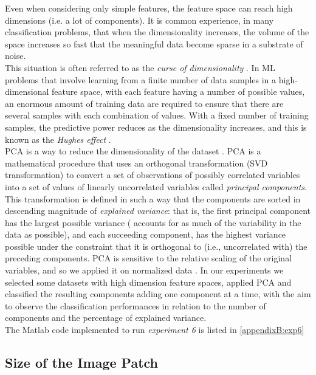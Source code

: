 Even when considering only simple features, the feature space can reach high dimensions (i.e. a lot of components). It is common experience,
in many classification problems, that when the dimensionality increases, the volume of the space increases so fast that the meaningful data become sparse
in a substrate of noise.\\
This situation is often referred to as the \textit{curse of dimensionality} \cite{bellmandynamic}.
In \Gls{ML} problems that involve learning from a finite number of data samples in a high-dimensional feature space,
with each feature having a number of possible values, an enormous amount of training data are required to ensure that there are several samples with each combination of values.
With a fixed number of training samples, the predictive power reduces as the dimensionality increases, and this is known as the \textit{Hughes effect} \cite{hughes}.\\
\Gls{PCA} is a way to reduce the dimensionality of the dataset \cite{PCA_jolliffe}. \Gls{PCA} is a mathematical procedure that uses an orthogonal transformation
(SVD transformation) to convert a set of observations of possibly correlated variables into a set of values of linearly uncorrelated variables called \textit{principal components}.
This transformation is defined in such a way that the components are sorted in descending magnitude of \textit{explained variance}: that is, the first principal component
has the largest possible variance ( accounts for as much of the variability in the data as possible), and each succeeding component, has the highest variance possible under the constraint
that it is orthogonal to (i.e., uncorrelated with) the preceding components. \Gls{PCA} is sensitive to the relative scaling of the original variables, 
and so we applied it on normalized data \cite{PCA02_applications}.
In our experiments we selected some datasets with high dimension feature spaces, applied \Gls{PCA} and classified the resulting components adding one component at a time, with the aim to
observe the classification performances in relation to the number of components and the percentage of explained variance.
\\
The Matlab code implemented to run \textit{experiment 6} is listed in \ref{appendixB:exp6}


\vspace{0.5cm}

\subsection{Size of the Image Patch}

